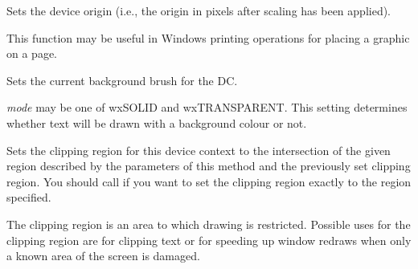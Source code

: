 


\label{wxdcsetdeviceorigin}


Sets the device origin (i.e., the origin in pixels after scaling has been
applied).

This function may be useful in Windows printing
operations for placing a graphic on a page.

\label{wxdcsetbackground}


Sets the current background brush for the DC.

\label{wxdcsetbackgroundmode}


{\it mode} may be one of wxSOLID and wxTRANSPARENT. This setting determines
whether text will be drawn with a background colour or not.

\label{wxdcsetclippingregion}





Sets the clipping region for this device context to the intersection of the
given region described by the parameters of this method and the previously set
clipping region. You should call 
 if you want to set
the clipping region exactly to the region specified.

The clipping region is an area to which drawing is restricted. Possible uses
for the clipping region are for clipping text or for speeding up window redraws
when only a known area of the screen is damaged.

